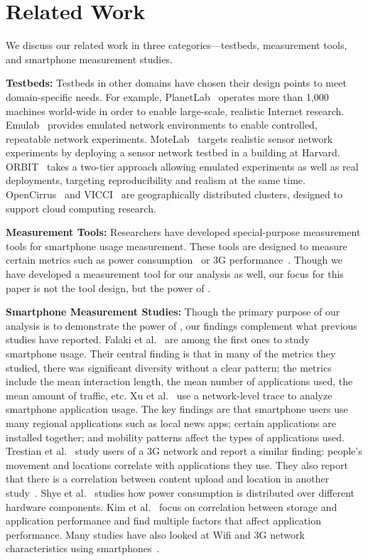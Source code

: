 \section{Related Work}
\label{sec:related}
We discuss our related work in three categories---testbeds, measurement tools,
and smartphone measurement studies.

{\bf Testbeds:} Testbeds in other domains have chosen their design points
to meet domain-specific needs. For example, PlanetLab~\cite{peterson:ccr:2003,
planetlab} operates more than 1,000 machines world-wide in order to enable
large-scale, realistic Internet research. Emulab~\cite{white:osdi:2002, emulab}
provides emulated network environments to enable controlled, repeatable network
experiments. MoteLab~\cite{werner-allen:ipsn:2005} targets realistic sensor
network experiments by deploying a sensor network testbed in a building at
Harvard. ORBIT~\cite{raychaudhuri:tridentcom:2005} takes a two-tier approach
allowing emulated experiments as well as real deployments, targeting
reproducibility and realism at the same time.
OpenCirrus~\cite{avetisyan:computer:2010, opencirrus} and VICCI~\cite{vicci} are
geographically distributed clusters, designed to support cloud computing
research.

{\bf Measurement Tools:} Researchers have developed special-purpose
measurement tools for smartphone usage measurement. These tools are designed to
measure certain metrics such as power consumption~\cite{zhang:codes:2010,
pathak:eurosys:2012} or 3G performance~\cite{huang:mobisys:2010}. Though we have
developed a measurement tool for our analysis as well, our focus for this paper
is not the tool design, but the power of \PhoneLab{}.

{\bf Smartphone Measurement Studies:}
Though the primary purpose of our analysis is to demonstrate the power of
\PhoneLab{}, our findings complement what previous studies have reported. Falaki
et al.~\cite{falaki:mobisys:2010} are among the first ones to study smartphone
usage. Their central finding is that in many of the metrics they studied, there
was significant diversity without a clear pattern; the metrics include the mean
interaction length, the mean number of applications used, the mean amount of
traffic, etc. Xu et al.~\cite{xu:imc:2011} use a network-level trace to analyze
smartphone application usage. The key findings are that smartphone users use
many regional applications such as local news apps; certain applications are
installed together; and mobility patterns affect the types of applications
used. Trestian et al.~\cite{trestian:imc:2009} study users of a 3G network and
report a similar finding: people's movement and locations correlate with
applications they use. They also report that there is a correlation between
content upload and location in another study~\cite{trestian:ton:2012}. Shye et
al.~\cite{shye:micro:2009} studies how power consumption is distributed over
different hardware components. Kim et al.~\cite{kim:fast:2012} focus on
correlation between storage and application performance and find multiple
factors that affect application performance. Many studies have also looked at
Wifi and 3G network characteristics using
smartphones~\cite{keralapura:mobicom:2010, maier:pam:2010, gember:pam:2011}.

